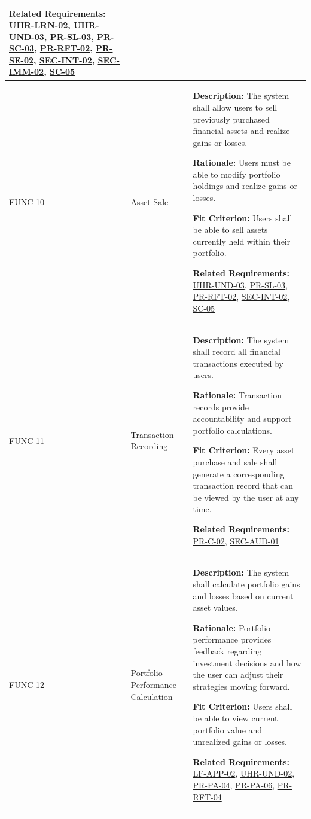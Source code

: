 \documentclass[12pt]{article}
\begin{document}
\begin{xltabular}{\textwidth}{|p{2.6cm}|p{3.4cm}|X|}
\textbf{Related Requirements:} \hyperlink{req:UHR-LRN-02}{UHR-LRN-02}, \hyperlink{req:UHR-UND-03}{UHR-UND-03}, \hyperlink{req:PR-SL-03}{PR-SL-03}, \hyperlink{req:PR-SC-03}{PR-SC-03}, \hyperlink{req:PR-RFT-02}{PR-RFT-02}, \hyperlink{req:PR-SE-02}{PR-SE-02}, \hyperlink{req:SEC-INT-02}{SEC-INT-02}, \hyperlink{req:SEC-IMM-02}{SEC-IMM-02}, \hyperlink{req:SC-05}{SC-05}\\
\hline

FUNC-10\hypertarget{req:FUNC-10}{} & 
Asset Sale & 
\textbf{Description:} The system shall allow users to sell previously purchased financial assets and realize gains or losses.

\textbf{Rationale:} Users must be able to modify portfolio holdings and realize gains or losses.

\textbf{Fit Criterion:} Users shall be able to sell assets currently held within their portfolio.

\textbf{Related Requirements:} \hyperlink{req:UHR-UND-03}{UHR-UND-03}, \hyperlink{req:PR-SL-03}{PR-SL-03}, \hyperlink{req:PR-RFT-02}{PR-RFT-02}, \hyperlink{req:SEC-INT-02}{SEC-INT-02}, \hyperlink{req:SC-05}{SC-05}\\
\hline

FUNC-11\hypertarget{req:FUNC-11}{} & 
Transaction Recording & 
\textbf{Description:} The system shall record all financial transactions executed by users.

\textbf{Rationale:} Transaction records provide accountability and support portfolio calculations.

\textbf{Fit Criterion:} Every asset purchase and sale shall generate a corresponding transaction record that can be viewed by the user at any time.

\textbf{Related Requirements:} \hyperlink{req:PR-C-02}{PR-C-02}, \hyperlink{req:SEC-AUD-01}{SEC-AUD-01}\\
\hline

FUNC-12\hypertarget{req:FUNC-12}{} & 
Portfolio Performance Calculation & 
\textbf{Description:} The system shall calculate portfolio gains and losses based on current asset values.

\textbf{Rationale:} Portfolio performance provides feedback regarding investment decisions and how the user can adjust their strategies moving forward.

\textbf{Fit Criterion:} Users shall be able to view current portfolio value and unrealized gains or losses.

\textbf{Related Requirements:} \hyperlink{req:LF-APP-02}{LF-APP-02}, \hyperlink{req:UHR-UND-02}{UHR-UND-02}, \hyperlink{req:PR-PA-04}{PR-PA-04}, \hyperlink{req:PR-PA-06}{PR-PA-06}, \hyperlink{req:PR-RFT-04}{PR-RFT-04}\\
\hline


\end{xltabular}
\end{document}
